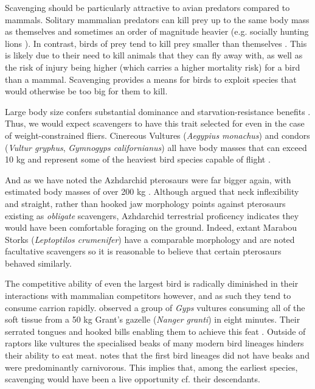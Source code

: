\documentclass[a4paper,12pt]{article}
\begin{document}
Scavenging should be particularly attractive to avian predators compared to mammals.
Solitary mammalian predators can kill prey up to the same body mass as themselves and sometimes an order of magnitude heavier (e.g. socially hunting lions \citep{owen2008predator}).
In contrast, birds of prey tend to kill prey smaller than themselves \citep{slagsvold2007prey}.
This is likely due to their need to kill animals that they can fly away with, as well as the risk of injury being higher (which carries a higher mortality risk) for a bird than a mammal.
Scavenging provides a means for birds to exploit species that would otherwise be too big for them to kill.

Large body size confers substantial dominance and starvation-resistance benefits \citep{ruxton2004obligate}.
Thus, we would expect scavengers to have this trait selected for even in the case of weight-constrained fliers.
Cinereous Vultures (\textit{Aegypius monachus}) and condors (\textit{Vultur gryphus}, \textit{Gymnogyps californianus}) all have body masses that can exceed 10 kg and represent some of the heaviest bird species capable of flight \citep{ferguson2001raptors,donazar2002effects}.

And as we have noted the Azhdarchid pterosaurs were far bigger again, with estimated body masses of over 200 kg \citep{witton2010size}. Although \cite{witton2008reappraisal} argued that neck inflexibility and straight, rather than hooked jaw morphology points against pterosaurs existing as \textit{obligate} scavengers, Azhdarchid terrestrial proficency indicates they would have been comfortable foraging on the ground.
Indeed, extant Marabou Storks (\textit{Leptoptilos crumenifer}) %
have a comparable morphology and are noted facultative scavengers so it is reasonable to believe that certain pterosaurs behaved similarly.

The competitive ability of even the largest bird is radically diminished in their interactions with mammalian competitors however, and as such they tend to consume carrion rapidly. 
\cite{houston1974role} observed a group of \textit{Gyps} vultures consuming all of the soft tissue from a 50 kg Grant’s gazelle (\textit{Nanger granti}) in eight minutes. 
Their serrated tongues and hooked bills enabling them to achieve this feat \citep{houston1975digestive}. 
Outside of raptors like vultures the specialised beaks of many modern bird lineages hinders their ability to eat meat. 
 \cite{martyniuk2012field} notes that the first bird lineages did not have beaks and were predominantly carnivorous. 
This implies that, among the earliest species, scavenging would have been a live opportunity cf. their descendants. 
\end{document}
